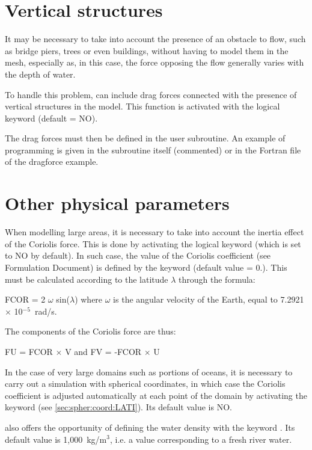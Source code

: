 \section{Vertical structures}

It may be necessary to take into account the presence of an obstacle to flow,
such as bridge piers, trees or even buildings, without having to model them in
the mesh, especially as, in this case, the force opposing the flow generally
varies with the depth of water.

To handle this problem,  can include drag forces connected with the
presence of vertical structures in the model.
This function is activated with the logical keyword 
(default = NO).

The drag forces must then be defined in the  user
subroutine.
An example of programming is given in the subroutine itself (commented)
or in the Fortran file of the dragforce example.


\section{Other physical parameters}

When modelling large areas, it is necessary to take into account the inertia
effect of the Coriolis force.
This is done by activating the logical keyword  (which is set
to NO by default).
In such case, the value of the Coriolis coefficient (see Formulation Document)
is defined by the keyword  (default value = 0.).
This must be calculated according to the latitude $\lambda$ through the formula:

 FCOR = 2 $\omega$ sin($\lambda$) where $\omega$ is the angular velocity of the
Earth, equal to 7.2921 $\times$ 10$^{-5}$~rad/s.

The components of the Coriolis force are thus:

FU = FCOR $\times$ V         and         FV = -FCOR $\times$ U

In the case of very large domains such as portions of oceans,
it is necessary to carry out a simulation with spherical coordinates,
in which case the Coriolis coefficient is adjusted automatically at each point
of the domain by activating the keyword 
(see \ref{sec:spher:coord:LATI}).
Its default value is NO.

 also offers the opportunity of defining the water density
with the keyword .
Its default value is 1,000~kg/m$^3$, i.e. a value corresponding to a fresh river
water.


